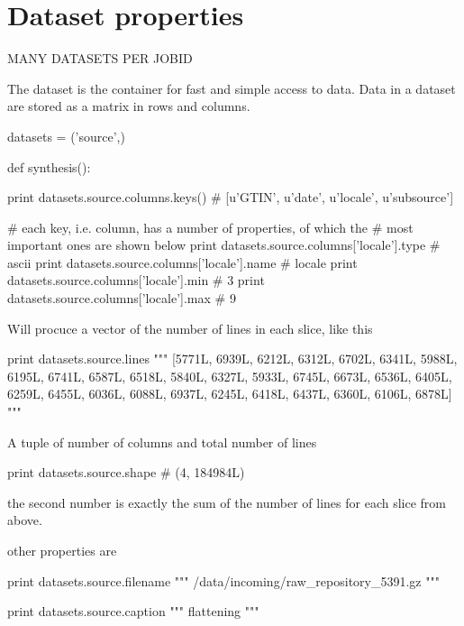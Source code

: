 \section{Dataset properties}

MANY DATASETS PER JOBID

The dataset is the container for fast and simple access to data.  Data
in a dataset are stored as a matrix in rows and columns.

\begin{python}
datasets = ('source',)

def synthesis():
\end{python}

\begin{python}
  print datasets.source.columns.keys()
  # [u'GTIN', u'date', u'locale', u'subsource']

  # each key, i.e. column, has a number of properties, of which the
  # most important ones are shown below
  print datasets.source.columns['locale'].type
  # ascii
  print datasets.source.columns['locale'].name
  # locale
  print datasets.source.columns['locale'].min
  # 3
  print datasets.source.columns['locale'].max
  # 9
  
\end{python}

Will procuce a vector of the number of lines in each slice, like this

\begin{python}
  print datasets.source.lines
  """
[5771L, 6939L, 6212L, 6312L, 6702L, 6341L, 5988L, 6195L,
 6741L, 6587L, 6518L, 5840L, 6327L, 5933L, 6745L, 6673L,
 6536L, 6405L, 6259L, 6455L, 6036L, 6088L, 6937L, 6245L,
 6418L, 6437L, 6360L, 6106L, 6878L]
"""
\end{python}

A tuple of number of columns and total number of lines

\begin{python}
  print datasets.source.shape
  # (4, 184984L)
\end{python}
the second number is exactly the sum of the number of lines for each
slice from above.

other properties are

\begin{python}
  print datasets.source.filename
  """
/data/incoming/raw_repository_5391.gz
"""
\end{python}

\begin{python}
  print datasets.source.caption
  """
flattening
"""
\end{python}


